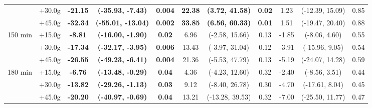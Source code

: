 \begin{table}[ht]
{\begin{tabular}{llccccccccc}
 & +30.0g & \textbf{-21.15} & \textbf{(-35.93, -7.43)} & \textbf{0.004} & \textbf{22.38} & \textbf{(3.72, 41.58)} & \textbf{0.02} & 1.23 & (-12.39, 15.09) & 0.85 \\
 & +45.0g & \textbf{-32.34} & \textbf{(-55.01, -13.04)} & \textbf{0.002} & \textbf{33.85} & \textbf{(6.56, 60.33)} & \textbf{0.01} & 1.51 & (-19.47, 20.40) & 0.88 \\
\midrule
\multirow{3}{*}{150 min} & +15.0g & \textbf{-8.81} & \textbf{(-16.00, -1.90)} & \textbf{0.02} & 6.96 & (-2.58, 15.66) & 0.13 & -1.85 & (-8.06, 4.60) & 0.55 \\
 & +30.0g & \textbf{-17.34} & \textbf{(-32.17, -3.95)} & \textbf{0.006} & 13.43 & (-3.97, 31.04) & 0.12 & -3.91 & (-15.96, 9.05) & 0.54 \\
 & +45.0g & \textbf{-26.55} & \textbf{(-49.23, -6.41)} & \textbf{0.004} & 21.36 & (-5.53, 47.79) & 0.13 & -5.19 & (-24.07, 14.28) & 0.59 \\
\midrule
\multirow{3}{*}{180 min} & +15.0g & \textbf{-6.76} & \textbf{(-13.48, -0.29)} & \textbf{0.04} & 4.36 & (-4.23, 12.60) & 0.32 & -2.40 & (-8.56, 3.51) & 0.44 \\
 & +30.0g & \textbf{-13.82} & \textbf{(-29.26, -1.13)} & \textbf{0.03} & 9.12 & (-8.40, 26.78) & 0.30 & -4.70 & (-17.61, 8.04) & 0.45 \\
 & +45.0g & \textbf{-20.20} & \textbf{(-40.97, -0.69)} & \textbf{0.04} & 13.21 & (-13.28, 39.53) & 0.32 & -7.00 & (-25.50, 11.77) & 0.47 \\
\bottomrule
\end{tabular}%
}
\end{table}
